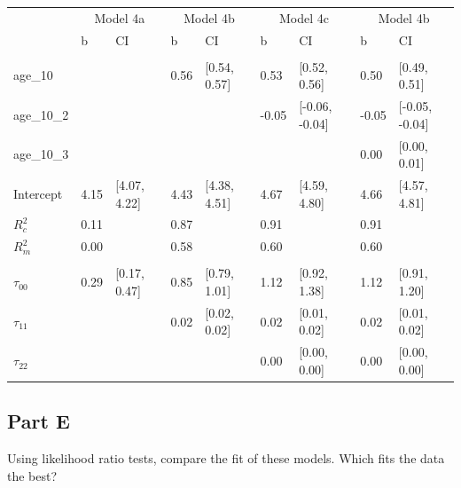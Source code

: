 \documentclass[]{article}
\begin{document}
\begin{table}[H]
\centering
\begin{tabular}{lllllllll}
\toprule
\multicolumn{1}{c}{ } & \multicolumn{2}{c}{Model 4a} & \multicolumn{2}{c}{Model 4b} & \multicolumn{2}{c}{Model 4c} & \multicolumn{2}{c}{Model 4b} \\
\cmidrule(l{2pt}r{2pt}){2-3} \cmidrule(l{2pt}r{2pt}){4-5} \cmidrule(l{2pt}r{2pt}){6-7} \cmidrule(l{2pt}r{2pt}){8-9}
 & b & CI & b & CI & b & CI & b & CI\\
\midrule
\addlinespace[0.3em]
\multicolumn{9}{l}{\textbf{Fixed}}\\
\hspace{1em}age\_10 &  &  & 0.56 & [0.54, 0.57] & 0.53 & [0.52, 0.56] & 0.50 & [0.49, 0.51]\\
\hspace{1em}age\_10\_2 &  &  &  &  & -0.05 & [-0.06, -0.04] & -0.05 & [-0.05, -0.04]\\
\hspace{1em}age\_10\_3 &  &  &  &  &  &  & 0.00 & [0.00, 0.01]\\
\hspace{1em}Intercept & 4.15 & [4.07, 4.22] & 4.43 & [4.38, 4.51] & 4.67 & [4.59, 4.80] & 4.66 & [4.57, 4.81]\\
$R^2_c$ & 0.11 &  & 0.87 &  & 0.91 &  & 0.91 & \\
$R^2_m$ & 0.00 &  & 0.58 &  & 0.60 &  & 0.60 & \\
\addlinespace[0.3em]
\multicolumn{9}{l}{\textbf{Random}}\\
\hspace{1em}$\tau_{00}$ & 0.29 & [0.17, 0.47] & 0.85 & [0.79, 1.01] & 1.12 & [0.92, 1.38] & 1.12 & [0.91, 1.20]\\
\hspace{1em}$\tau_{11}$ &  &  & 0.02 & [0.02, 0.02] & 0.02 & [0.01, 0.02] & 0.02 & [0.01, 0.02]\\
\hspace{1em}$\tau_{22}$ &  &  &  &  & 0.00 & [0.00, 0.00] & 0.00 & [0.00, 0.00]\\
\bottomrule
\end{tabular}
\end{table}

\subsection{Part E}\label{part-e}

Using likelihood ratio tests, compare the fit of these models. Which
fits the data the best?
\end{document}
